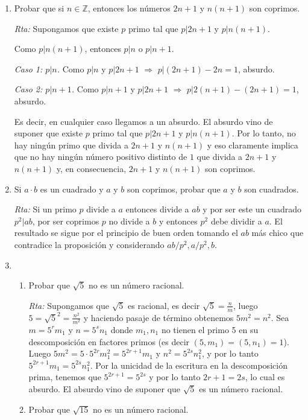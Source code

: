 \documentclass[a4paper,12pt,twoside,spanish,reqno]{amsbook}
\numberwithin{equation}{section}
\newcommand{\rta}{\noindent\textit{Rta: }}
\begin{document}
\begin{enumerate}
 \rta  $\sqrt{113}< 11$ y 113 no es divisible por 2, 3, 5 y 7, por lo tanto es primo. $123=3\cdot 41$ luego no es primo. 131 es primo, pues $\sqrt{131}<12$ y 131 no es divisible por 2, 3, 7 y 11. 151 es primo, pues $\sqrt{151}<13$ y 151 no es divisible por 2, 3, 7 y 11. 199 es primo, pues $\sqrt{199}<14$ y 199 no es divisible por 2, 3, 7, 11 y 13. 503 es primo, pues $\sqrt{503} \sim 22.42...<23$ y 503 no es divisible por 2, 3, 7, 11, 13, 17 y 19.
 


 \item Probar que si $n \in {\mathbb Z}$, entonces los números $2n+1$ y $n(n+1)$ son coprimos.

 \rta Supongamos que existe  $p$ primo tal que $p| 2n+1$ y $p | n(n+1)$. 
 
 Como $p | n(n+1)$,  entonces $p|n$ o $p| n+1$. 
 
 \textit{Caso 1: $p|n$.}  Como $p|n$ y $p| 2n +1$ $\Rightarrow$ $p| (2n +1) -2n = 1$,  absurdo. 
 
 \textit{Caso 2: $p|n+1$.}  Como $p|n +1$ y $p| 2n +1$ $\Rightarrow$ $p| 2(n+1) - (2n +1) = 1$,  absurdo. 
 
 Es decir, en cualquier caso llegamos a un absurdo. El absurdo vino de suponer que  existe  $p$ primo tal que $p| 2n+1$ y $p | n(n+1)$. Por lo tanto,  no hay ningún primo que divida a  $2n+1$ y $n(n+1)$ y  eso claramente implica que no hay ningún número positivo distinto de $1$  que divida a  $2n+1$ y $n(n+1)$ y,  en consecuencia, $2n+1$ y $n(n+1)$ son coprimos.
 

\item Si $a\cdot b$ es un cuadrado y $a$ y $b$ son coprimos, probar que $a$ y $b$ son cuadrados.

\rta  Si un primo $p$ divide a $a$ entonces divide a $ab$ y por ser este un cuadrado $p^2\vert ab$, por ser coprimos $p$ no divide a $b$ y entonces $p^2$ debe dividir a $a$. El resultado se sigue por el principio de buen orden tomando el $ab$ más chico que contradice la proposición y considerando $ab/p^2, a/p^2, b$.


\item 
\begin{enumerate}
    \item Probar  que $\sqrt{5}$ no es un número racional.     
    
    \rta Supongamos que  $\sqrt{5}$ es racional, es decir $\sqrt{5} = \displaystyle \frac{n}{m}$, luego $5 =\sqrt{5}^2 =\displaystyle \frac{n^2}{m^2}$ y haciendo pasaje de término obtenemos $5m^2 = n^2$. Sea $m = 5^rm_1$ y $n = 5^sn_1$ donde $m_1,n_1$ no tienen el primo 5 en su descomposición en factores primos (es decir $(5,m_1) = (5,n_1) = 1$). Luego $5m^2 = 5 \cdot 5^{2r}m_1^2= 5^{2r+1}m_1$ y $n^2 = 5^{2s}n_1^2$, y por lo tanto $5^{2r+1}m_1 =   5^{2s}n_1^2$. Por la unicidad de la escritura en la descomposición prima,  tenemos que  $5^{2r+1}= 5^{2s}$ y por lo tanto  ${2r+1}= {2s}$, lo cual es absurdo. El absurdo vino de suponer que   $\sqrt{5}$ es un número racional.
    \item Probar  que $\sqrt{15}$ no es un número racional.      
    

\end{enumerate}
\end{enumerate}
\end{document}
